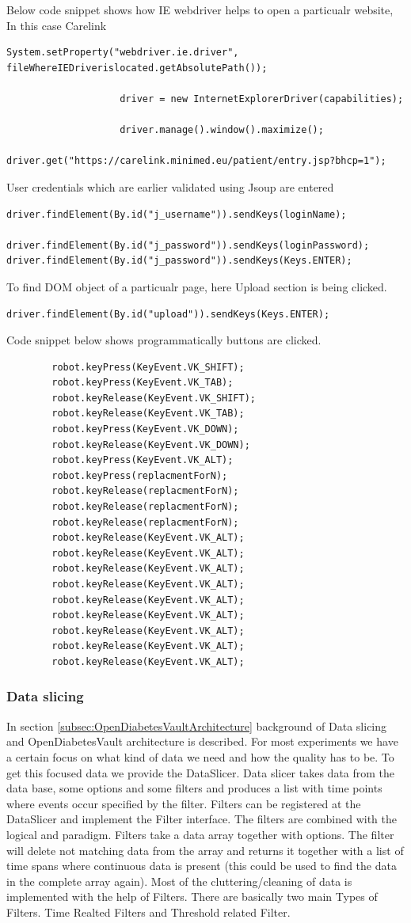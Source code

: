 \documentclass[article,type=msc,colorback,accentcolor=tud9c,twoside,11pt]{tudthesis}
\begin{document}
Below code snippet shows how IE webdriver helps to open a particualr website, In this case Carelink
\begin{lstlisting}
System.setProperty("webdriver.ie.driver", fileWhereIEDriverislocated.getAbsolutePath());

					driver = new InternetExplorerDriver(capabilities);

					driver.manage().window().maximize();
					driver.get("https://carelink.minimed.eu/patient/entry.jsp?bhcp=1");
\end{lstlisting}
User credentials which are earlier validated using Jsoup are entered
\begin{lstlisting}
driver.findElement(By.id("j_username")).sendKeys(loginName);
				driver.findElement(By.id("j_password")).sendKeys(loginPassword);
driver.findElement(By.id("j_password")).sendKeys(Keys.ENTER);
\end{lstlisting}
To find DOM object of a particualr page, here Upload section is being clicked.
\begin{lstlisting}
driver.findElement(By.id("upload")).sendKeys(Keys.ENTER);
\end{lstlisting}
 Code snippet below shows programmatically buttons are clicked.
\begin{lstlisting}
		robot.keyPress(KeyEvent.VK_SHIFT);
		robot.keyPress(KeyEvent.VK_TAB);
		robot.keyRelease(KeyEvent.VK_SHIFT);
		robot.keyRelease(KeyEvent.VK_TAB);
		robot.keyPress(KeyEvent.VK_DOWN);
		robot.keyRelease(KeyEvent.VK_DOWN);
		robot.keyPress(KeyEvent.VK_ALT);
		robot.keyPress(replacmentForN);
		robot.keyRelease(replacmentForN);
		robot.keyRelease(replacmentForN);
		robot.keyRelease(replacmentForN);
		robot.keyRelease(KeyEvent.VK_ALT);
		robot.keyRelease(KeyEvent.VK_ALT);
		robot.keyRelease(KeyEvent.VK_ALT);
		robot.keyRelease(KeyEvent.VK_ALT);
		robot.keyRelease(KeyEvent.VK_ALT);
		robot.keyRelease(KeyEvent.VK_ALT);
		robot.keyRelease(KeyEvent.VK_ALT);
		robot.keyRelease(KeyEvent.VK_ALT);
		robot.keyRelease(KeyEvent.VK_ALT);
\end{lstlisting}


\subsubsection{Data slicing}
In section \ref{subsec:OpenDiabetesVaultArchitecture} background of Data slicing and OpenDiabetesVault architecture is described. For most experiments we have a certain focus on what kind of data we need and how the quality has to be. To get this focused data we provide the DataSlicer. Data slicer takes data from the data base, some options and some filters and produces a list with time points where events occur specified by the filter. Filters can be registered at the DataSlicer and implement the Filter interface. The filters are combined with the logical and paradigm. Filters take a data array together with options. The filter will delete not matching data from the array and returns it together with a list of time spans where continuous data is present (this could be used to find the data in the complete array again).  Most of the cluttering/cleaning of data is implemented with the help of Filters. There are basically two main Types of Filters. Time Realted Filters and Threshold related Filter.
\end{document}
